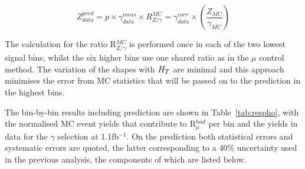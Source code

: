 \begin{equation}
Z^{pred}_{data} = p \times \gamma^{meas}_{data}\times R^{MC}_{Z/\gamma} = \gamma^{corr}_{data}\times (\frac{Z_{MC}}{\gamma_{MC}})
\label{eq:phopred}
\end{equation}

The calculation for the ratio R$^{MC}_{Z/\gamma}$ is performed once in each of the two lowest signal bins, whilst the six higher bins use one shared ratio as in the $\mu$ control method. The variation of the shapes with $H_{T} $ are minimal and this approach minimises the error from MC statistics that will be passed on to the prediction in the highest bins. 

The bin-by-bin results including prediction are shown in Table~\ref{tab:respho}, with the normalised MC event yields that contribute to R$^{had}_{\mu}$ per bin and the yields in data for the $\gamma$ selection at 1.1fb$^{-1}$. On the prediction both statistical errors and systematic errors are quoted, the latter corresponding to a 40\% uncertainty used in the previous analysis, the components of which are listed below.

